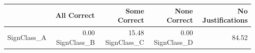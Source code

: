 \begin{tabular}{lrrrr}
\toprule
 & All Correct & Some Correct & None Correct & No Justifications \\
\midrule
SignClass_A & 0.00%
SignClass_B & 15.48%
SignClass_C & 0.00%
SignClass_D & 84.52%
\bottomrule
\end{tabular}
